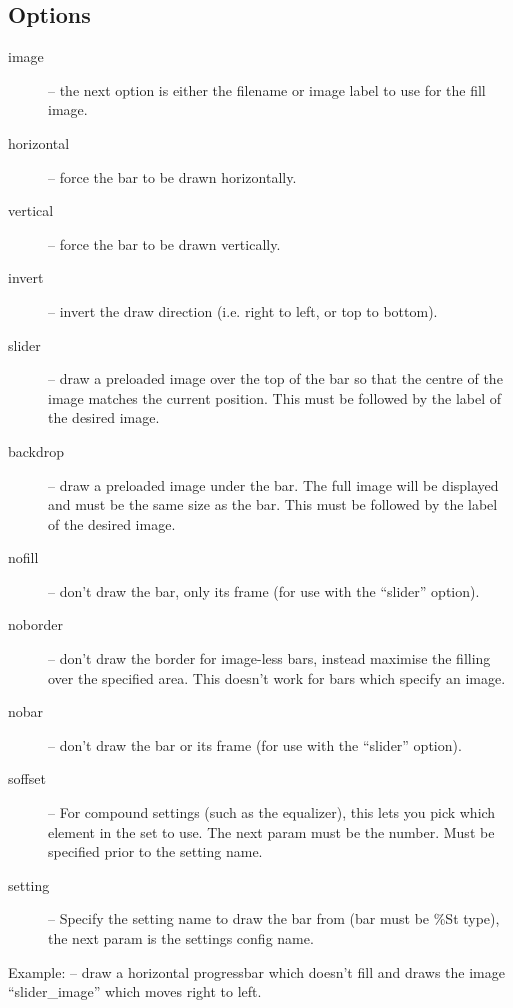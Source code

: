 \subsection{Options}
\begin{description}
  \item[image] -- the next option is either the filename or image label to
    use for the fill image.
  \item[horizontal] -- force the bar to be drawn horizontally.
  \item[vertical] -- force the bar to be drawn vertically.
  \item[invert] -- invert the draw direction (i.e. right to left, or top to
    bottom).
  \item[slider] -- draw a preloaded image over the top of the bar so that
    the centre of the image matches the current position. This must be
    followed by the label of the desired image.
  \item[backdrop] -- draw a preloaded image under the bar. The full
    image will be displayed and must be the same size as the bar.
    This must be followed by the label of the desired image.
  \item[nofill] -- don't draw the bar, only its frame (for use with the
     ``slider'' option).
  \item[noborder] -- don't draw the border for image-less bars, instead maximise
    the filling over the specified area. This doesn't work for bars which
    specify an image.
  \item[nobar] -- don't draw the bar or its frame (for use with the
    ``slider'' option).
  \item[soffset] -- For compound settings (such as the equalizer), this lets you pick which element in the set to use. The next param must be the number.  Must be specified prior to the setting name.
  \item[setting] -- Specify the setting name to draw the bar from (bar must be
    \%St type), the next param is the settings config name.
\end{description}

Example:  -- draw
a horizontal progressbar which doesn't fill and draws the image
``slider\_image'' which moves right to left.


